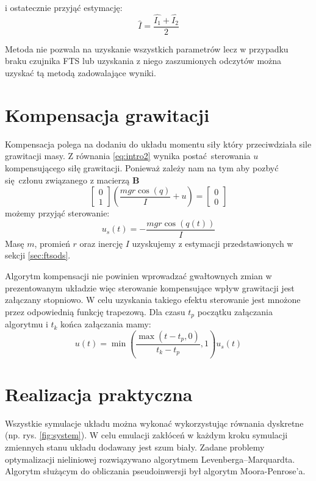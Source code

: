 \documentclass[a4paper, 10pt]{article}
\begin{document}
i ostatecznie przyjąć estymację:
\begin{equation}
\hat{I} = \frac{\hat{I_1}+\hat{I_2}}{2}
\end{equation}


Metoda nie pozwala na uzyskanie wszystkich parametrów lecz w przypadku braku czujnika FTS lub uzyskania z niego zaszumionych odczytów można uzyskać tą metodą zadowalające wyniki.

\section{Kompensacja grawitacji}
Kompensacja polega na dodaniu do układu momentu siły który przeciwdziała sile grawitacji masy. Z równania \ref{eq:intro2} wynika postać sterowania $u$ kompensującego siłę grawitacji. Ponieważ zależy nam na tym aby pozbyć się członu związanego z macierzą $\mathbf{B}$
\begin{equation}
	\begin{bmatrix}
	0 \\
	1
	\end{bmatrix}
	(\frac{mgr\cos{(q)}}{I} + u) = 	\begin{bmatrix}
	0 \\
	0
	\end{bmatrix}
\end{equation}
możemy przyjąć sterowanie:
\begin{equation}
u_s(t) = -\frac{mgr\cos{(q(t))}}{I}
\end{equation}
Masę $m$, promień $r$ oraz inercję $I$ uzyskujemy z estymacji przedstawionych w sekcji \ref{sec:ftsods}.


Algorytm kompensacji nie powinien wprowadzać gwałtownych zmian w prezentowanym układzie więc sterowanie kompensujące wpływ grawitacji jest załączany stopniowo. W celu uzyskania takiego efektu sterowanie jest mnożone przez odpowiednią funkcję trapezową. Dla czasu $t_p$ początku załączania algorytmu i $t_k$ końca załączania mamy:
\begin{equation}
u(t) = \min{(\frac{\max{( t - t_p, 0)}}{t_k-t_p}, 1)}u_s(t)
\end{equation}


\section{Realizacja praktyczna}
Wszystkie symulacje układu można wykonać wykorzystując równania dyskretne (np. rys. \ref{fig:system}). W celu emulacji zakłóceń w każdym kroku symulacji zmiennych stanu układu dodawany jest szum biały. Zadane problemy optymalizacji nieliniowej rozwiązywano algorytmem Levenberga–Marquardta. Algorytm służącym do obliczania pseudoinwersji był algorytm Moora-Penrose'a.
\end{document}

